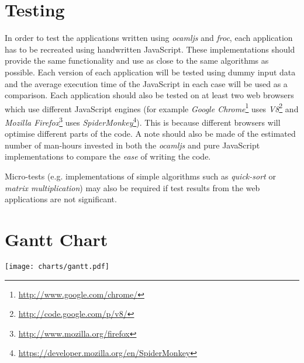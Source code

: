 \section{Testing}
In order to test the applications written using \emph{ocamljs} and \emph{froc}, each application has to be recreated using handwritten JavaScript. These implementations should provide the same functionality and use as close to the same algorithms as possible. Each version of each application will be tested using dummy input data and the average execution time of the JavaScript in each case will be used as a comparison. Each application should also be tested on at least two web browsers which use different JavaScript engines (for example \emph{Google Chrome}\footnote{\url{http://www.google.com/chrome/}} uses \emph{V8}\footnote{\url{http://code.google.com/p/v8/}} and \emph{Mozilla Firefox}\footnote{\url{http://www.mozilla.org/firefox}} uses \emph{SpiderMonkey}\footnote{\url{https://developer.mozilla.org/en/SpiderMonkey}}). This is because different browsers will optimise different parts of the code. A note should also be made of the estimated number of man-hours invested in both the \emph{ocamljs} and pure JavaScript implementations to compare the \emph{ease} of writing the code.

Micro-tests (e.g. implementations of simple algorithms such as \emph{quick-sort} or \emph{matrix multiplication}) may also be required if test results from the web applications are not significant.
\vfill

\section{Gantt Chart}
\begin{center}
\texttt{[image: charts/gantt.pdf]}
\end{center}
